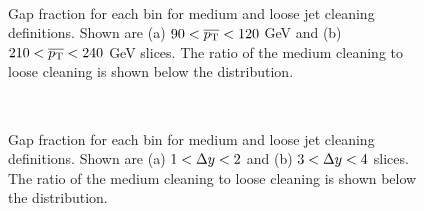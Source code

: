 \begin{figure}
\centering
\mbox{
              \quad
              \quad
                              }
\caption[Effect of jet cleaning on the gap fraction verses \ptb{}]{
Gap fraction for each \dy{} bin for medium and loose jet cleaning definitions. 
Shown are (a) $90<\mbox{$\overline{p_{\rm T}}$}{}<120$ GeV and (b)$210<\mbox{$\overline{p_{\rm T}}$}{}<240$ GeV slices.
The ratio of the medium cleaning to loose cleaning is shown below the distribution.
\label{JetCleanGF_dy}}
\end{figure}


\begin{figure}
\centering
\mbox{
              \quad
              \quad
                              }
\caption[Effect of jet cleaning on the gap fraction verses \dy{}]{
Gap fraction for each \ptb{} bin for medium and loose jet cleaning definitions. 
Shown are (a) $1<\mbox{$\Delta y$}{}<2$ and (b) $3<\mbox{$\Delta y$}{}<4$ slices.
The ratio of the medium cleaning to loose cleaning is shown below the distribution.
\label{JetCleanGF_pt}}
\end{figure}





